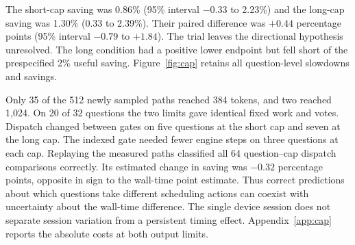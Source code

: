The short-cap saving was 0.86\% (95\% interval $-0.33$ to 2.23\%) and the long-cap saving was 1.30\% (0.33 to 2.39\%). Their paired difference was $+0.44$ percentage points (95\% interval $-0.79$ to $+1.84$). The trial leaves the directional hypothesis unresolved. The long condition had a positive lower endpoint but fell short of the prespecified 2\% useful saving. Figure~\ref{fig:cap} retains all question-level slowdowns and savings.

Only 35 of the 512 newly sampled paths reached 384 tokens, and two reached 1,024. On 20 of 32 questions the two limits gave identical fixed work and votes. Dispatch changed between gates on five questions at the short cap and seven at the long cap. The indexed gate needed fewer engine steps on three questions at each cap. Replaying the measured paths classified all 64 question--cap dispatch comparisons correctly. Its estimated change in saving was $-0.32$ percentage points, opposite in sign to the wall-time point estimate. Thus correct predictions about which questions take different scheduling actions can coexist with uncertainty about the wall-time difference. The single device session does not separate session variation from a persistent timing effect. Appendix~\ref{app:cap} reports the absolute costs at both output limits.
